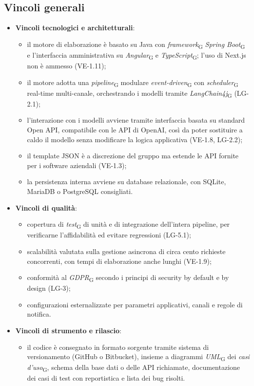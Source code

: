 \subsection{Vincoli generali}
	\begin{itemize}
		\item \textbf{Vincoli tecnologici e architetturali}:
			\begin{itemize}
				\item il motore di elaborazione è basato su Java con \textit{framework}\textsubscript{G} \textit{Spring Boot}\textsubscript{G} e l'interfaccia amministrativa su \textit{Angular}\textsubscript{G} e \textit{TypeScript}\textsubscript{G}; l'uso di Next.js non è ammesso (VE-1.11);
				\item il motore adotta una \textit{pipeline}\textsubscript{G} modulare \textit{event-driven}\textsubscript{G} con \textit{scheduler}\textsubscript{G} real-time multi-canale, orchestrando i modelli tramite \textit{LangChain4j}\textsubscript{G} (LG-2.1);
				\item l'interazione con i modelli avviene tramite interfaccia basata su standard Open API, compatibile con le API di OpenAI, così da poter sostituire a caldo il modello senza modificare la logica applicativa (VE-1.8, LG-2.2);
				\item il template JSON è a discrezione del gruppo ma estende le API fornite per i software aziendali (VE-1.3);
				\item la persistenza interna avviene su database relazionale, con SQLite, MariaDB o PostgreSQL consigliati.
			\end{itemize}
		\item \textbf{Vincoli di qualità}:
			\begin{itemize}
				\item copertura di \textit{test}\textsubscript{G} di unità e di integrazione dell'intera pipeline, per verificarne l'affidabilità ed evitare regressioni (LG-5.1);
				\item scalabilità valutata sulla gestione asincrona di circa cento richieste concorrenti, con tempi di elaborazione anche lunghi (VE-1.9);
				\item conformità al \textit{GDPR}\textsubscript{G} secondo i principi di security by default e by design (LG-3);
				\item configurazioni esternalizzate per parametri applicativi, canali e regole di notifica.
			\end{itemize}
		\item \textbf{Vincoli di strumento e rilascio}:
			\begin{itemize}
				\item il codice è consegnato in formato sorgente tramite sistema di versionamento (GitHub o Bitbucket), insieme a diagrammi \textit{UML}\textsubscript{G} dei \textit{casi d'uso}\textsubscript{G}, schema della base dati o delle API richiamate, documentazione dei casi di test con reportistica e lista dei bug risolti.
			\end{itemize}
	\end{itemize}

